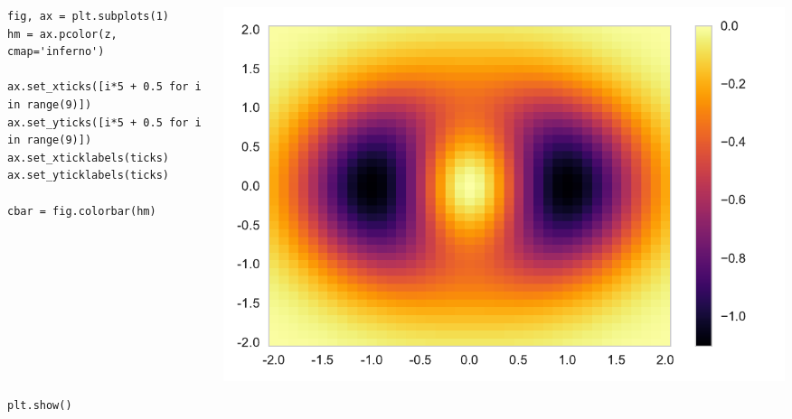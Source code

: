 \documentclass{beamer}
\begin{document}
\begin{frame}[fragile]
\tiny{
\begin{columns}
\begin{column}{0.45\textwidth}
\begin{verbatim}
fig, ax = plt.subplots(1)
hm = ax.pcolor(z, cmap='inferno')

ax.set_xticks([i*5 + 0.5 for i in range(9)])
ax.set_yticks([i*5 + 0.5 for i in range(9)])
ax.set_xticklabels(ticks)
ax.set_yticklabels(ticks)

cbar = fig.colorbar(hm)










plt.show()
\end{verbatim}
\end{column}
\begin{column}{0.55\textwidth}
\includegraphics[width=\textwidth]{heatmap_4.pdf}
\end{column}
\end{columns}
}
\end{frame}
\end{document}
